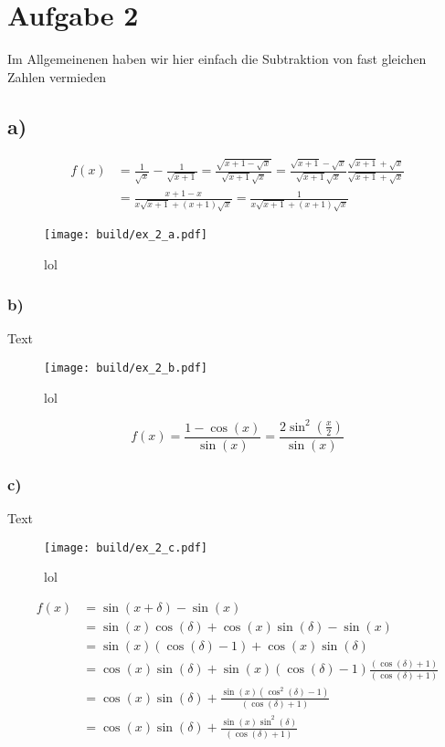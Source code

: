 \section*{Aufgabe 2}
Im Allgemeinenen haben wir hier einfach die Subtraktion von fast gleichen Zahlen vermieden
\subsection*{a)}
\begin{align*}
    f(x) &= \frac{1}{\sqrt{x}} - \frac{1}{\sqrt{x+1}}
    = \frac{\sqrt{x+1 - \sqrt{x}}}{\sqrt{x+1}\sqrt{x}}
    = \frac{\sqrt{x+1} - \sqrt{x}}{\sqrt{x+1}\sqrt{x}} \frac{\sqrt{x+1} + \sqrt{x}}{\sqrt{x+1} + \sqrt{x}} \\
    &= \frac{x+1-x}{x \sqrt{x+1} + (x+1)\sqrt{x}}  =
    \frac{1}{x \sqrt{x+1} + (x+1)\sqrt{x}}
\end{align*}
\begin{figure}
    \centering
    \texttt{[image: build/ex\_2\_a.pdf]}
    \caption{lol}
    \label{fig:a}
\end{figure}
\FloatBarrier
\subsubsection*{b)}
Text
\begin{figure}
    \centering
    \texttt{[image: build/ex\_2\_b.pdf]}
    \caption{lol}
    \label{fig:b}
\end{figure}

\begin{equation*}
    f(x) = \frac{1- \cos (x)}{\sin (x)} = \frac{2\sin^2(\frac{x}{2})}{\sin(x)}
\end{equation*}
\FloatBarrier
\subsubsection*{c)}
Text
\begin{figure}
    \centering
    \texttt{[image: build/ex\_2\_c.pdf]}
    \caption{lol}
    \label{fig:c}
\end{figure}
\begin{align*}
    f(x) &= \sin(x + \delta) - \sin(x)                                                              \\
    &= \sin(x) \cos(\delta) + \cos(x) \sin (\delta) - \sin(x)                                       \\
    &= \sin(x) (\cos(\delta) -1) + \cos(x) \sin(\delta)                                             \\
    &= \cos(x) \sin(\delta) + \sin(x) (\cos(\delta) -1) \frac{(\cos(\delta) +1)}{(\cos(\delta) +1)} \\
    &= \cos(x) \sin(\delta) + \frac{\sin(x) (\cos^2(\delta) - 1)}{(\cos(\delta) +1)}                \\
    &= \cos(x) \sin(\delta) + \frac{\sin(x) \sin^2(\delta)}{(\cos(\delta) +1)}                      \\
\end{align*}  